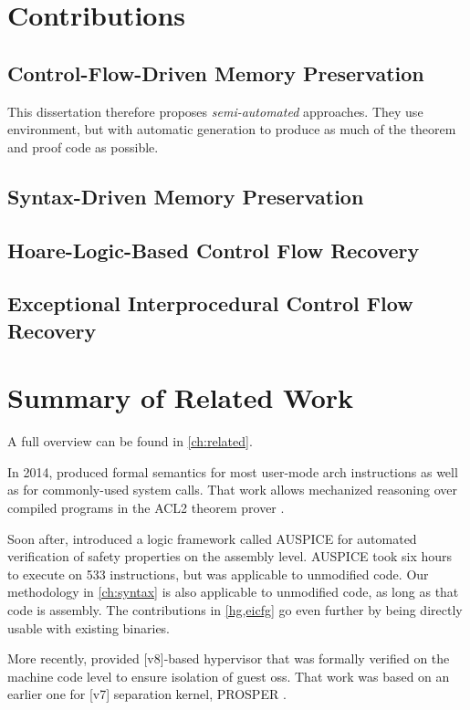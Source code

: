 \section{Contributions}

\subsection{Control-Flow-Driven Memory Preservation}
This dissertation therefore proposes \emph{semi-automated} approaches.
They use  environment, but with automatic generation to produce as much of the theorem and proof code as possible.

\subsection{Syntax-Driven Memory Preservation}

\subsection{Hoare-Logic-Based Control Flow Recovery}
\subsection{Exceptional Interprocedural Control Flow Recovery}

\section{Summary of Related Work}
A full overview can be found in \cref{ch:related}.

In 2014, \textcite{goel2014syscalls,goelphd} produced formal semantics
for most user-mode \gls{arch} instructions as well as for commonly-used system calls.
That work allows mechanized reasoning over compiled programs in the ACL2 theorem prover \autocite{ACL2}.

Soon after, \textcite{tan2015auspice} introduced a logic framework called AUSPICE for automated verification of safety properties on the assembly level.
AUSPICE took six hours to execute on \num{533} instructions, but was applicable to unmodified code.
Our methodology in \cref{ch:syntax} is also applicable to unmodified code, as long as that code is assembly.
The contributions in \cref{hg,eicfg} go even further by being directly usable with existing binaries.

More recently, \textcite{baumann2016high} provided [v8]-based hypervisor that was formally verified on the machine code level to ensure isolation of guest \acp{os}.
That work was based on an earlier one for [v7] separation kernel, PROSPER \autocite{dam2013hypervisor,dam2013formal}.


